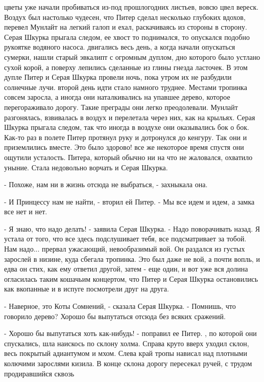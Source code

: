 цветы уже начали пробиваться из-под прошлогодних листьев, вовсю цвел 
вереск. Воздух был настолько чудесен, что Питер сделал несколько 
глубоких вдохов, перевел Мунлайт на легкий галоп и ехал, раскачиваясь 
из стороны в сторону. Серая Шкурка прыгала следом, ее хвост то 
поднимался, то опускался подобно рукоятке водяного насоса.
 двигались весь день, а когда начали опускаться сумерки, нашли 
старый эвкалипт с огромным дуплом, дно которого было устлано сухой 
корой, а поверху лепились сделанные из глины гнезда ласточек. В этом 
дупле Питер и Серая Шкурка провели ночь, пока утром их не разбудили 
солнечные лучи.
 второй день идти стало намного труднее. Местами тропинка совсем 
заросла, а иногда они наталкивались на упавшее дерево, которое 
перегораживало дорогу. Такие преграды они легко преодолевали. Мунлайт 
разгонялась, взвивалась в воздух и перелетала через них, как на 
крыльях. Серая Шкурка прыгала следом, так что иногда в воздухе они 
оказывались бок о бок. Как-то раз в полете Питер протянул руку и 
дотронулся до кенгуру. Так они и приземлились вместе. Это было 
здорово!
 все же некоторое время спустя они ощутили усталость. Питера, 
который обычно ни на что не жаловался, охватило уныние. Стала 
недовольно ворчать и Серая Шкурка.
\par- Похоже, нам ни в жизнь отсюда не выбраться, - захныкала она.
\par- И Принцессу нам не найти, - вторил ей Питер. - Мы все идем и 
идем, а замка все нет и нет.
\par- Я знаю, что надо делать! - заявила Серая Шкурка. - Надо 
поворачивать назад. Я устала от того, что все здесь подслушивает тебя, 
все подсматривает за тобой. Нам надо...
 прервал ужасающий, невообразимый вой. Он раздался из густых 
зарослей в низине, куда сбегала тропинка. Это был даже не вой, а почти 
вопль, и едва он стих, как ему ответил другой, затем - еще один, и вот 
уже вся долина огласилась таким кошачьим концертом, что Питер и Серая 
Шкурка остановились как вкопанные и в испуге посмотрели друг на друга.
\par- Наверное, это Коты Сомнений, - сказала Серая Шкурка. - Помнишь, 
что говорило дерево? Хорошо бы выпутаться отсюда без всяких сражений.
\par- Хорошо бы выпутаться хоть как-нибудь! - поправил ее Питер.
, по которой они спускались, шла наискось по склону холма. 
Справа круто вверх уходил склон, весь покрытый адиантумом и мхом. 
Слева край тропы нависал над плотными колючими зарослями кизила. В 
конце склона дорогу пересекал ручей, с трудом продиравшийся сквозь 
